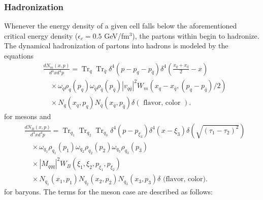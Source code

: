 \subsubsection{Hadronization}
Whenever the energy density of a given cell falls below the aforementioned critical energy density ($\epsilon_c = 0.5$ GeV/fm$^{3}$), the partons within begin to hadronize. The dynamical hadronization of partons into hadrons is modeled by the equations
%
\begin{equation}
\label{eq:meson_hadronization}
\begin{aligned}
& \frac{d N_m(x, p)}{d^4 x d^4 p}=\operatorname{Tr}_q \operatorname{Tr}_{\bar{q}} \delta^4\left(p-p_q-p_{\bar{q}}\right) \delta^4\left(\frac{x_q+x_{\bar{q}}}{2}-x\right) \\
& \quad \times \omega_q \rho_q\left(p_q\right) \omega_{\bar{q}} \rho_{\bar{q}}\left(p_{\bar{q}}\right)\left|v_{q \bar{q}}\right|^2 W_m\left(x_q-x_{\bar{q}},\left(p_q-p_{\bar{q}}\right) / 2\right) \\
& \quad \times N_q\left(x_q, p_q\right) N_{\bar{q}}\left(x_{\bar{q}}, p_{\bar{q}}\right) \delta(\text { flavor, color }) .
\end{aligned}
\end{equation}
%
for mesons and 
%
\begin{equation}
\label{eq:baryon_hadronization}
\begin{aligned}
& \frac{d N_B(x, p)}{d^4 x d^4 p}=\operatorname{Tr}_{q_1} \operatorname{Tr}_{q_2} \operatorname{Tr}_{q_3} \delta^4\left(p-p_{\xi_3}\right) \delta^4\left(x-\xi_3\right) \delta\left(\sqrt{\left(\tau_1-\tau_2\right)^2}\right) \\
& \quad \times \omega_{q_1} \rho_{q_1}\left(p_1\right) \omega_{q_2} \rho_{q_2}\left(p_2\right) \omega_{q_3} \rho_{q_3}\left(p_3\right) \\
& \quad \times\left|M_{q q q}\right|^2 W_B\left(\xi_1, \xi_2, p_{\xi_1}, p_{\xi_2}\right) \\
& \quad \times N_{q_1}\left(x_1, p_1\right) N_{q_2}\left(x_2, p_2\right) N_{q_3}\left(x_3, p_3\right) \delta \text { (flavor, color). }
\end{aligned}
\end{equation}
for baryons. The terms for the meson case are described as follows:

